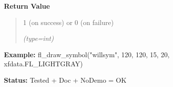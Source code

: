 \begin{boxedminipage}{\funcwidth}
      \textbf{Return Value}
    \vspace{-1ex}

      \begin{quote}
      1 (on success) or 0 (on failure)

      {\it (type=int)}

      \end{quote}

\textbf{Example:} fl\_draw\_symbol("willsym", 120, 120, 15, 20, xfdata.FL\_LIGHTGRAY)



\textbf{Status:} Tested + Doc + NoDemo = OK



    \end{boxedminipage}

    \label{xformslib:flbasic:fl_mapcolor}

    \vspace{0.5ex}

